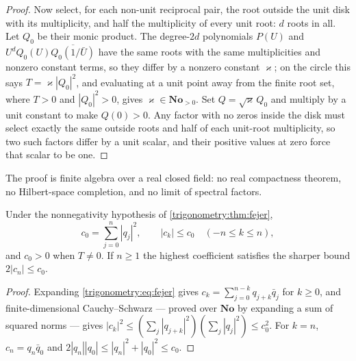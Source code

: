 \documentclass[11pt,letterpaper]{article}
\numberwithin{equation}{section}
\theoremstyle{definition}
\theoremstyle{remark}
\newcommand{\No}{\mathbf{No}}
\begin{document}
\begin{proof}
Now select, for each non-unit reciprocal pair, the root outside the unit disk with its multiplicity,
and half the multiplicity of every unit root: $d$ roots in all. Let $Q_0$ be their monic product.
The degree-$2d$ polynomials $P(U)$ and $U^dQ_0(U)\overline{Q_0(1/\bar U)}$ have the same roots with
the same multiplicities and nonzero constant terms, so they differ by a nonzero constant $\varkappa$;
on the circle this says $T=\varkappa|Q_0|^2$, and evaluating at a unit point away from the finite
root set, where $T>0$ and $|Q_0|^2>0$, gives $\varkappa\in\No_{>0}$. Set $Q=\sqrt\varkappa\,Q_0$
and multiply by a unit constant to make $Q(0)>0$. Any factor with no zeros inside the disk must
select exactly the same outside roots and half of each unit-root multiplicity, so two such factors
differ by a unit scalar, and their positive values at zero force that scalar to be one.
\end{proof}
The proof is finite algebra over a real closed field: no real compactness theorem, no Hilbert-space
completion, and no limit of spectral factors.

\begin{corollary}\label{trigonometry:cor:coeffbounds}
Under the nonnegativity hypothesis of \cref{trigonometry:thm:fejer},
\[
 c_0=\sum_{j=0}^n|q_j|^2,\qquad |c_k|\le c_0\quad(-n\le k\le n),
\]
and $c_0>0$ when $T\ne0$. If $n\ge1$ the highest coefficient satisfies the sharper bound
$2|c_n|\le c_0$.
\end{corollary}
\begin{proof}
Expanding \cref{trigonometry:eq:fejer} gives $c_k=\sum_{j=0}^{n-k}q_{j+k}\bar q_j$ for $k\ge0$, and
finite-dimensional Cauchy--Schwarz --- proved over $\No$ by expanding a sum of squared norms ---
gives $|c_k|^2\le(\sum_j|q_{j+k}|^2)(\sum_j|q_j|^2)\le c_0^2$. For $k=n$, $c_n=q_n\bar q_0$ and
$2|q_n||q_0|\le|q_n|^2+|q_0|^2\le c_0$.
\end{proof}
\end{document}
